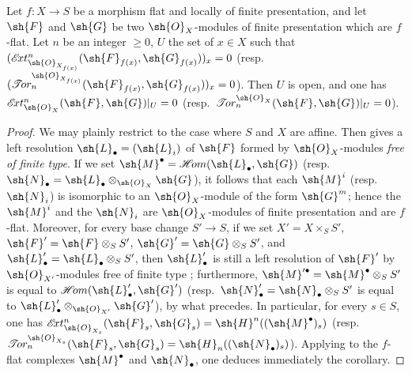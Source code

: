 \begin{corollary}[12.3.4]
\label{IV.12.3.4}
Let $f:X\to S$ be a morphism flat and locally of finite presentation, and let $\sh{F}$ and $\sh{G}$ be two $\sh{O}_X$-modules of finite presentation which are $f$-flat.
Let $n$ be an integer $\geq 0$, $U$ the set of $x\in X$ such that $(\mathscr{E}\!xt^n_{\sh{O}_{X_{f(x)}}}(\sh{F}_{f(x)},\sh{G}_{f(x)}))_x=0$ (resp.\ $(\mathscr{T}\!or_n^{\sh{O}_{X_{f(x)}}}(\sh{F}_{f(x)},\sh{G}_{f(x)}))_x=0$).
Then $U$ is open, and one has
$\mathscr{E}\!xt^n_{\sh{O}_X}(\sh{F},\sh{G})|_U=0$
(resp.\ $\mathscr{T}\!or_n^{\sh{O}_X}(\sh{F},\sh{G})|_U=0$).
\end{corollary}

\begin{proof}
We may plainly restrict to the case where $S$ and $X$ are affine.
Then  gives a left resolution $\sh{L}_\bullet=(\sh{L}_i)$ of $\sh{F}$ formed by $\sh{O}_X$-modules \emph{free of finite type}.
If we set $\sh{M}^\bullet=\mathscr{H}\!om(\sh{L}_\bullet,\sh{G})$ (resp.\ $\sh{N}_\bullet=\sh{L}_\bullet\otimes_{\sh{O}_X}\sh{G}$), it follows that each $\sh{M}^i$ (resp.\ $\sh{N}_i$) is isomorphic to an $\sh{O}_X$-module of the form $\sh{G}^m$; hence the $\sh{M}^i$ and the $\sh{N}_i$ are $\sh{O}_X$-modules of finite presentation and are $f$-flat.
Moreover, for every base change $S'\to S$, if we set
$X'=X\times_S S'$, $\sh{F}'=\sh{F}\otimes_S S'$, $\sh{G}'=\sh{G}\otimes_S S'$, and
$\sh{L}'_\bullet=\sh{L}_\bullet\otimes_S S'$, then $\sh{L}'_\bullet$ is still a left resolution of $\sh{F}'$ by $\sh{O}_{X'}$-modules free of finite type ; furthermore,
$\sh{M}'^\bullet=\sh{M}^\bullet\otimes_S S'$ is equal to $\mathscr{H}\!om(\sh{L}'_\bullet,\sh{G}')$
(resp.\ $\sh{N}'_\bullet=\sh{N}_\bullet\otimes_S S'$ is equal to $\sh{L}'_\bullet\otimes_{\sh{O}_{X'}}\sh{G}'$), by what precedes.
In particular, for every $s\in S$, one has
$\mathscr{E}\!xt^n_{\sh{O}_{X_s}}(\sh{F}_s,\sh{G}_s)=\sh{H}^n((\sh{M}^\bullet)_s)$
(resp.\ $\mathscr{T}\!or_n^{\sh{O}_{X_s}}(\sh{F}_s,\sh{G}_s)=\sh{H}_n((\sh{N}_\bullet)_s)$).
Applying  to the $f$-flat complexes $\sh{M}^\bullet$ and $\sh{N}_\bullet$, one deduces immediately the corollary.
\end{proof}
